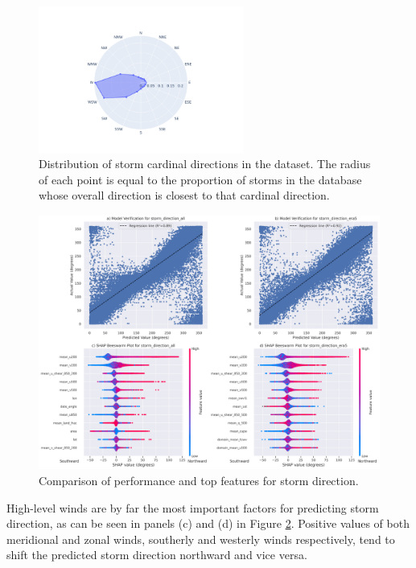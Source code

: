 \begin{figure}[ht]
    \centering
    \includegraphics[width=0.6\textwidth]{../figures/generated/exploration/storm_cardinal_directions_distribution.png}
    \caption{Distribution of storm cardinal directions in the dataset. The radius of each point is equal to the proportion of storms in the database whose overall direction is closest to that cardinal direction.}
    \label{fig:storm_cardinal_directions_distribution}
\end{figure}

\begin{figure}[ht]
    \centering
    \includegraphics[width=\textwidth]{../figures/generated/experiments/storm_direction/storm_direction_summary.png}
    \caption{Comparison of performance and top features for storm direction.}
    \label{fig:storm_direction_summary}
\end{figure}

High-level winds are by far the most important factors for predicting storm direction, as can be seen in panels (c) and (d) in Figure \ref{fig:storm_direction_summary}. Positive values of both meridional and zonal winds, southerly and westerly winds respectively, tend to shift the predicted storm direction northward and vice versa.

